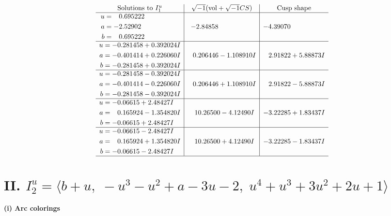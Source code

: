 \documentclass[1p]{elsarticle_modified}
\theoremstyle{definition}
\newcommand{\I}{\sqrt{-1}}
\begin{document}
$$\begin{array}{c|c|c}  
\text{Solutions to }I^u_{1}& \I (\text{vol} + \sqrt{-1}CS) & \text{Cusp shape}\\
 \hline 
\begin{aligned}
u &= \phantom{-}0.695222\phantom{ +0.000000I} \\
a &= -2.52902\phantom{ +0.000000I} \\
b &= \phantom{-}0.695222\phantom{ +0.000000I}\end{aligned}
 & -2.84858\phantom{ +0.000000I} & -4.39070\phantom{ +0.000000I} \\ \hline\begin{aligned}
u &= -0.281458 + 0.392024 I \\
a &= -0.401414 + 0.226060 I \\
b &= -0.281458 + 0.392024 I\end{aligned}
 & \phantom{-}0.206446 - 1.108910 I & \phantom{-}2.91822 + 5.88873 I \\ \hline\begin{aligned}
u &= -0.281458 - 0.392024 I \\
a &= -0.401414 - 0.226060 I \\
b &= -0.281458 - 0.392024 I\end{aligned}
 & \phantom{-}0.206446 + 1.108910 I & \phantom{-}2.91822 - 5.88873 I \\ \hline\begin{aligned}
u &= -0.06615 + 2.48427 I \\
a &= \phantom{-}0.165924 - 1.354820 I \\
b &= -0.06615 + 2.48427 I\end{aligned}
 & \phantom{-}10.26500 - 4.12490 I & -3.22285 + 1.83437 I \\ \hline\begin{aligned}
u &= -0.06615 - 2.48427 I \\
a &= \phantom{-}0.165924 + 1.354820 I \\
b &= -0.06615 - 2.48427 I\end{aligned}
 & \phantom{-}10.26500 + 4.12490 I & -3.22285 - 1.83437 I\\
 \hline 
 \end{array}$$\newpage\newpage\renewcommand{\arraystretch}{1}
\centering \section*{II. $I^u_{2}= \langle b+u,\;- u^3- u^2+a-3 u-2,\;u^4+u^3+3 u^2+2 u+1 \rangle$}
\flushleft \textbf{(i) Arc colorings}\\
\end{document}
